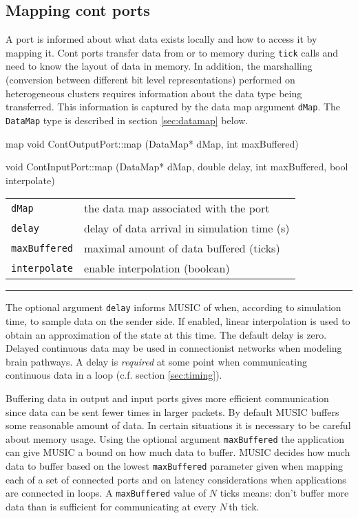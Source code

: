 \documentclass[a4paper,twoside]{report}
\makeatletter
\newenvironment{parameters}%
{\begin{tabular}{@{\hspace{2em}}lp{0.6\textwidth}}}%
{\end{tabular}\par\vspace{1mm}\par\hrule\par\vspace{5mm}}
\makeatother
\begin{document}
\subsection{Mapping cont ports}

A port is informed about what data exists locally and how to access it
by mapping it.  Cont ports transfer data from or to memory during
\lstinline|tick| calls and need to know the layout of data in memory.
In addition, the marshalling (conversion between different bit level
representations) performed on heterogeneous clusters requires
information about the data type being transferred.  This information
is captured by the data map argument \lstinline|dMap|.  The
\lstinline|DataMap| type is described in section \ref{sec:datamap}
below.

\clearpage
{}
\begin{head}{map}
  void ContOutputPort::map (DataMap* dMap,
                            int maxBuffered)

  void ContInputPort::map (DataMap* dMap,
                           double delay,
                           int maxBuffered,
                           bool interpolate)
\end{head}
\begin{parameters}
  \lstinline|dMap| & the data map associated with the port \\
  \lstinline|delay| & delay of data arrival in simulation time (s) \\
  \lstinline|maxBuffered| & maximal amount of data buffered (ticks)
  \\
  \lstinline|interpolate| & enable interpolation (boolean) \\
\end{parameters}

The optional argument \lstinline|delay| informs MUSIC of when,
according to simulation time, to sample data on the sender side.  If
enabled, linear interpolation is used to obtain an approximation of
the state at this time.  The default delay is zero.  Delayed continuous
data may be used in connectionist networks when modeling brain
pathways.  A delay is \emph{required} at some point when communicating
continuous data in a loop (c.f. section \ref{sec:timing}).

Buffering data in output and input ports gives more efficient
communication since data can be sent fewer times in larger packets.
By default MUSIC buffers some reasonable amount of data.  In certain
situations it is necessary to be careful about memory usage.  Using
the optional argument \lstinline|maxBuffered| the application can
give MUSIC a bound on how much data to buffer.  MUSIC decides how much
data to buffer based on the lowest \lstinline|maxBuffered| parameter
given when mapping each of a set of connected ports and on latency
considerations when applications are connected in loops.  A
\lstinline|maxBuffered| value of \(N\) ticks means: don't buffer more
data than is sufficient for communicating at every \(N\)\,th tick.
\end{document}
